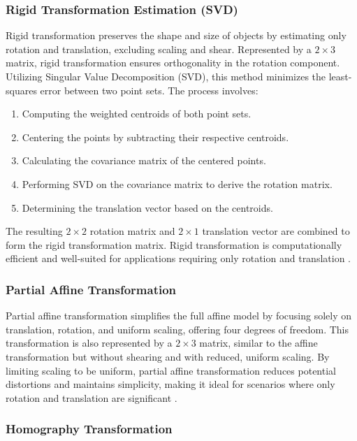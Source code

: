 \subsubsection{Rigid Transformation Estimation (SVD)}

Rigid transformation preserves the shape and size of objects by estimating only rotation and translation, excluding scaling and shear. Represented by a  \(2 \times 3\) matrix, rigid transformation ensures orthogonality in the rotation component. Utilizing Singular Value Decomposition (SVD), this method minimizes the least-squares error between two point sets. The process involves:

\begin{enumerate} 
    \item Computing the weighted centroids of both point sets. 
    \item Centering the points by subtracting their respective centroids. 
    \item Calculating the covariance matrix of the centered points. 
    \item Performing SVD on the covariance matrix to derive the rotation matrix. 
    \item Determining the translation vector based on the centroids. 
\end{enumerate}

The resulting \(2 \times 2\) rotation matrix and \(2 \times 1\) translation vector are combined to form the rigid transformation matrix. Rigid transformation is computationally efficient and well-suited for applications requiring only rotation and translation \cite{sorkine2017least_squares}.

\subsubsection{Partial Affine Transformation}

Partial affine transformation simplifies the full affine model by focusing solely on translation, rotation, and uniform scaling, offering four degrees of freedom. This transformation is also represented by a \(2 \times 3\) matrix, similar to the affine transformation but without shearing and with reduced, uniform scaling. By limiting scaling to be uniform, partial affine transformation reduces potential distortions and maintains simplicity, making it ideal for scenarios where only rotation and translation are significant \cite{opencv_warp_affine}.

\subsubsection{Homography Transformation}

